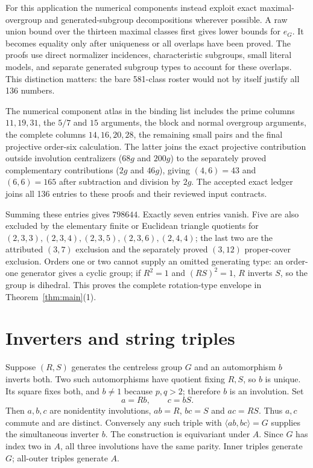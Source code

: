 \documentclass[11pt,a4paper]{article}
\newcommand{\gen}[1]{\langle #1\rangle}
\begin{document}
For this application the numerical components instead exploit exact
maximal-overgroup and generated-subgroup decompositions wherever possible.
A raw union bound over the thirteen maximal classes first gives lower
bounds for $e_G$. It becomes equality only after uniqueness or all
overlaps have been proved. The proofs use direct normalizer incidences,
characteristic subgroups, small literal models, and separate generated
subgroup types to account for these overlaps. This distinction matters:
the bare 581-class roster would not by itself justify all 136 numbers.

The numerical component atlas in the binding list includes the prime
columns $11,19,31$, the $5/7$ and $15$ arguments, the block and normal
overgroup arguments, the complete columns $14,16,20,28$, the remaining
small pairs and the final projective order-six calculation. The latter
joins the exact projective contribution outside involution centralizers
($68g$ and $200g$) to the separately proved complementary contributions
($2g$ and $46g$), giving $(4,6)=43$ and $(6,6)=165$ after subtraction and
division by $2g$. The accepted exact ledger joins all 136 entries to these
proofs and their reviewed input contracts.


Summing these entries gives $798644$. Exactly seven entries vanish.
Five are also excluded by the elementary finite or Euclidean triangle
quotients for $(2,3,3),(2,3,4),(2,3,5),(2,3,6),(2,4,4)$; the last two
are the attributed $(3,7)$ exclusion and the separately proved $(3,12)$
proper-cover exclusion. Orders one or two cannot supply an omitted
generating type: an order-one generator gives a cyclic group; if $R^2=1$
and $(RS)^2=1$, $R$ inverts $S$, so the group is dihedral. This proves
the complete rotation-type envelope in Theorem~\ref{thm:main}(1).

\section{Inverters and string triples}\label{sec:strings}
Suppose $(R,S)$ generates the centreless group $G$ and an automorphism
$b$ inverts both. Two such automorphisms have quotient fixing $R,S$, so
$b$ is unique. Its square fixes both, and $b\ne1$ because $p,q>2$;
therefore $b$ is an involution. Set
\[
 a=Rb,\qquad c=bS.
\]
Then $a,b,c$ are nonidentity involutions, $ab=R$, $bc=S$ and $ac=RS$.
Thus $a,c$ commute and are distinct. Conversely any such triple with
$\gen{ab,bc}=G$ supplies the simultaneous inverter $b$. The construction
is equivariant under $A$. Since $G$ has index two in $A$, all three
involutions have the same parity. Inner triples generate $G$; all-outer
triples generate $A$.
\end{document}
